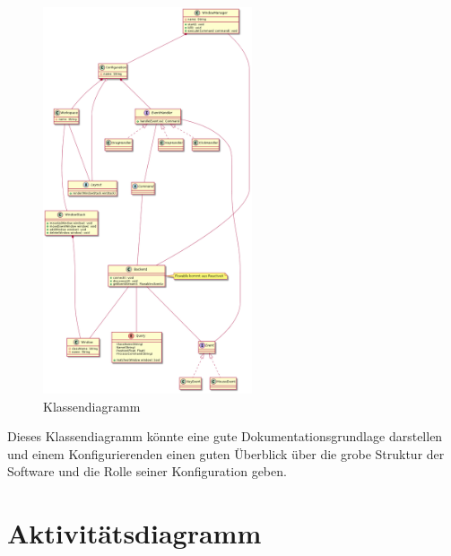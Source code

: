 \documentclass{article}
\begin{document}
\vfill

\begin{figure}[h]
	\centering
	\includegraphics[width=0.55\textwidth]{class}
	\caption{Klassendiagramm}
\end{figure}

\vfill

Dieses Klassendiagramm könnte eine gute Dokumentationsgrundlage darstellen und
einem Konfigurierenden einen guten Überblick über die grobe Struktur der
Software und die Rolle seiner Konfiguration geben.

\newpage

\section{Aktivitätsdiagramm}

\vfill
\end{document}
